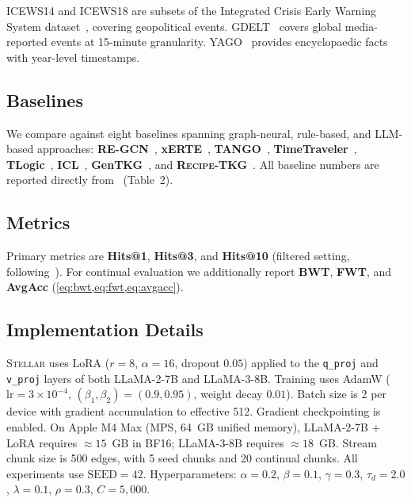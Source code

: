 \documentclass[10pt,twocolumn]{article}
\theoremstyle{definition}
\newcommand{\recipe}{\textsc{Recipe-TKG}}
\begin{document}
ICEWS14 and ICEWS18 are subsets of the Integrated Crisis Early Warning
System dataset~\citep{Boschee2015icews}, covering geopolitical events.
GDELT~\citep{Leetaru2013gdelt} covers global media-reported events at
15-minute granularity.
YAGO~\citep{Mahdisoltani2015yago} provides encyclopaedic facts with
year-level timestamps.

\subsection{Baselines}

We compare against eight baselines spanning graph-neural, rule-based, and
LLM-based approaches:
\textbf{RE-GCN}~\citep{Li2021regcn},
\textbf{xERTE}~\citep{Han2020xerte},
\textbf{TANGO}~\citep{Han2021tango},
\textbf{TimeTraveler}~\citep{Sun2021timetraveler},
\textbf{TLogic}~\citep{Liu2022tlogic},
\textbf{ICL}~\citep{Xiong2024icl},
\textbf{GenTKG}~\citep{Liao2024gentkg}, and
\textbf{\recipe{}}~\citep{Akgul2025recipe}.
All baseline numbers are reported directly from~\citet{Akgul2025recipe}
(Table~2).

\subsection{Metrics}

Primary metrics are \textbf{Hits@1}, \textbf{Hits@3}, and \textbf{Hits@10}
(filtered setting, following~\citealt{Bordes2013transe}).
For continual evaluation we additionally report \textbf{BWT},
\textbf{FWT}, and \textbf{AvgAcc} (\cref{eq:bwt,eq:fwt,eq:avgacc}).

\subsection{Implementation Details}
\label{sec:impl}

\textsc{Stellar} uses LoRA ($r{=}8$, $\alpha{=}16$, dropout $0.05$) applied to the
\texttt{q\_proj} and \texttt{v\_proj} layers of both LLaMA-2-7B
and LLaMA-3-8B.
Training uses AdamW ($\text{lr}=3{\times}10^{-4}$,
$(\beta_1,\beta_2)=(0.9, 0.95)$, weight decay $0.01$).
Batch size is 2 per device with gradient accumulation to effective 512.
Gradient checkpointing is enabled.
On Apple M4 Max (MPS, 64~GB unified memory), LLaMA-2-7B + LoRA requires
$\approx 15$~GB in BF16; LLaMA-3-8B requires $\approx 18$~GB.
Stream chunk size is 500 edges, with 5 seed chunks and 20 continual chunks.
All experiments use $\text{SEED}{=}42$.
Hyperparameters: $\alpha{=}0.2$, $\beta{=}0.1$, $\gamma{=}0.3$,
$\tau_d{=}2.0$, $\lambda{=}0.1$, $\rho{=}0.3$, $C{=}5{,}000$.
\end{document}

